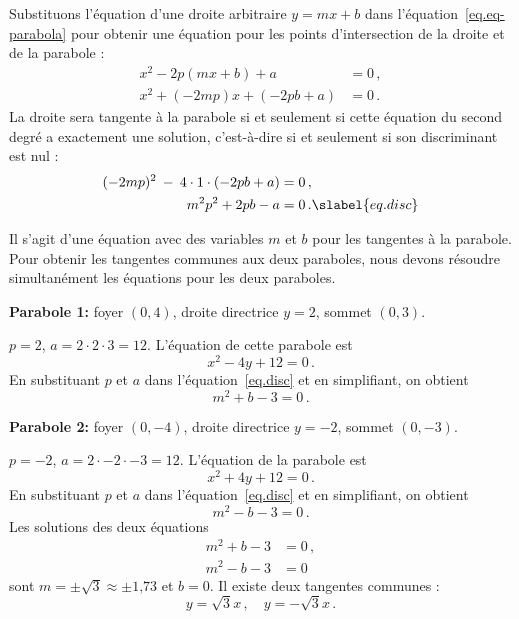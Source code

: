 Substituons l'équation d'une droite arbitraire $y=mx+b$ dans l'équation~\ref{eq.eq-parabola} pour obtenir une équation pour les points d'intersection de la droite et de la parabole :
\begin{align*}
x^2-2p(mx+b)+a&=0\,,\\
x^2+(-2mp)x+(-2pb+a)&=0\,.
\end{align*}
La droite sera tangente à la parabole si et seulement si cette équation du second degré a exactement une solution, c'est-à-dire si et seulement si son discriminant est nul :
\begin{subequations}
\begin{align}
(-2mp)^2\:-\:4\cdot 1\cdot (-2pb+a)&=0\,,\\
m^2p^2+2pb-a&=0\,.\slabel{eq.disc}
\end{align}
\end{subequations}

Il s'agit d'une équation avec des variables $m$ et $b$ pour les tangentes à la parabole. Pour obtenir les tangentes communes aux deux paraboles, nous devons résoudre simultanément les équations pour les deux paraboles.



\begin{example}\mbox{}

\noindent\textbf{Parabole 1:} foyer $(0,4)$, droite directrice $y=2$, sommet $(0,3)$.

\noindent{}$p=2$, $a=2\cdot 2\cdot 3=12$. L'équation de cette parabole est 
\[
x^2-4y +12=0\,.
\]
En substituant $p$ et $a$ dans l'équation~\ref{eq.disc} et en simplifiant, on obtient 
\[
m^2+b-3=0\,.
\]

\noindent\textbf{Parabole 2:} foyer $(0,-4)$, droite directrice $y=-2$, sommet $(0,-3)$.

\noindent{}$p=-2$, $a=2\cdot -2\cdot -3=12$. L'équation de la parabole est 
\[
x^2+4y+12=0\,.
\]
En substituant $p$ et $a$ dans l'équation~\ref{eq.disc} et en simplifiant, on obtient 
\[
m^2-b-3=0\,.
\]
Les solutions des deux équations 
\begin{align*}
m^2+b-3&=0\,,\\
m^2-b-3&=0
\end{align*}
sont $m=\pm\sqrt{3}\approx \pm \mbox{1,73}$ et $b=0$. Il existe deux tangentes communes :
\[
y=\sqrt{3}x\,,\quad y=-\sqrt{3}x\,.
\]
\end{example}

